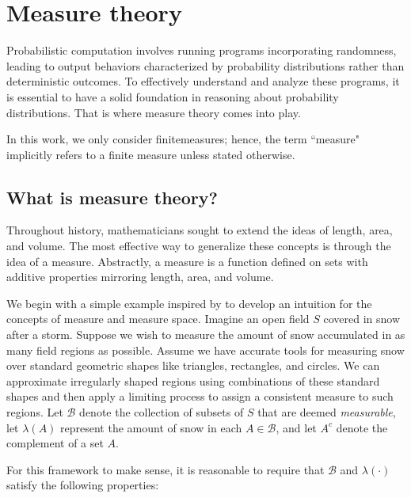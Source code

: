 \section{Measure theory}
Probabilistic computation involves running programs incorporating randomness, leading to output behaviors characterized by probability distributions rather than deterministic outcomes. To effectively understand and analyze these programs, it is essential to have a solid foundation in reasoning about probability distributions. That is where measure theory comes into play.


In this work, we only consider finitemeasures; hence, the term ``measure" implicitly refers to a finite measure unless stated otherwise.

\subsection{What is measure theory?}

Throughout history, mathematicians sought to extend the ideas of length, area, and volume. The most effective way to generalize these concepts is through the idea of a measure. Abstractly, a measure is a function defined on sets with additive properties mirroring length, area, and volume.

We begin with a simple example inspired by \cite{athreyaMeasureTheoryProbability2006} to develop an intuition for the concepts of measure and measure space.
Imagine an open field $S$ covered in snow after a storm. Suppose we wish to measure the amount of snow accumulated in as many field regions as possible.
Assume we have accurate tools for measuring snow over standard geometric shapes like triangles, rectangles, and circles. 
We can approximate irregularly shaped regions using combinations of these standard shapes and then apply a limiting process to assign a consistent measure to such regions. 
Let $\mathcal{B}$ denote the collection of subsets of $S$ that are deemed \emph{measurable}, let $\lambda(A)$ represent the amount of snow in each $A \in \mathcal{B}$, and let $A^c$ denote the complement of a set $A$.


For this framework to make sense, it is reasonable to require that $ \mathcal{B}$ and $\lambda (\cdot)$ satisfy the following properties:

